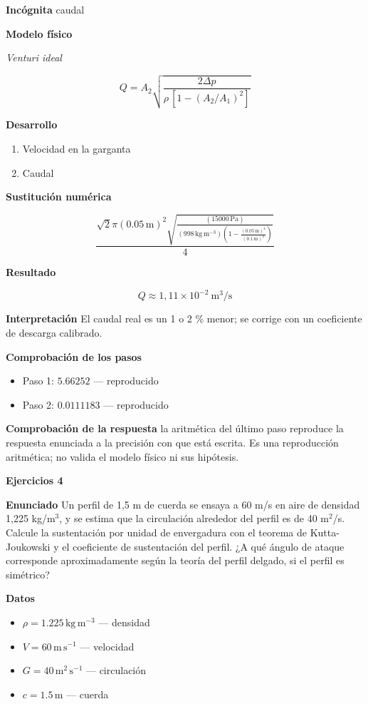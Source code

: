 \documentclass[10pt,openany]{book}
\begin{document}
\noindent\textbf{Incógnita}
caudal

\noindent\textbf{Modelo físico}

\noindent\textit{Venturi ideal}

\[
Q = A_2\sqrt{\frac{2\Delta p}{\rho\,[1 - (A_2/A_1)^{2}]}}
\]

\noindent\textbf{Desarrollo}
\begin{enumerate}
\item
Velocidad en la garganta
\item
Caudal
\end{enumerate}

\noindent\textbf{Sustitución numérica}

\[
\frac{\sqrt{2} \pi \left(0.05\,\mathrm{m}\right)^{2} \sqrt{\frac{\left(15000\,\mathrm{Pa}\right)}{\left(998\,\mathrm{kg}\,\mathrm{m}^{-3}\right) \left(1 - \frac{\left(0.05\,\mathrm{m}\right)^{4}}{\left(0.1\,\mathrm{m}\right)^{4}}\right)}}}{4}
\]

\noindent\textbf{Resultado}

\[
Q \approx 1{,}11\times 10^{-2}\ \mathrm{m^{3}/s}
\]

\noindent\textbf{Interpretación}
El caudal real es un 1 o 2 \% menor; se corrige con un coeficiente de descarga calibrado.

\noindent\textbf{Comprobación de los pasos}
\begin{itemize}
\item Paso 1: $5.66252$ — reproducido
\item Paso 2: $0.0111183$ — reproducido
\end{itemize}

\noindent\textbf{Comprobación de la respuesta} la aritmética del último paso reproduce la respuesta enunciada a la precisión con que está escrita. Es una reproducción aritmética; no valida el modelo físico ni sus hipótesis.

\noindent\textbf{Ejercicios 4}

\noindent\textbf{Enunciado}
Un perfil de 1,5 m de cuerda se ensaya a 60 m/s en aire de densidad 1,225 kg/m\(^3\), y se estima que la circulación alrededor del perfil es de 40 m\(^2\)/s. Calcule la sustentación por unidad de envergadura con el teorema de Kutta-Joukowski y el coeficiente de sustentación del perfil. ¿A qué ángulo de ataque corresponde aproximadamente según la teoría del perfil delgado, si el perfil es simétrico?

\noindent\textbf{Datos}
\begin{itemize}
\item $\rho = 1.225\,\mathrm{kg}\,\mathrm{m}^{-3}$ — densidad
\item $V = 60\,\mathrm{m}\,\mathrm{s}^{-1}$ — velocidad
\item $G = 40\,\mathrm{m}^{2}\,\mathrm{s}^{-1}$ — circulación
\item $c = 1.5\,\mathrm{m}$ — cuerda
\end{itemize}
\end{document}
